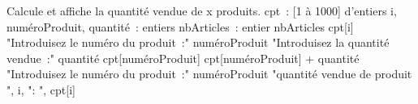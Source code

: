 	\begin{Pseudocode}
	\LComment Calcule et affiche la quantité vendue de x produits.
		\Empty
		\Decl cpt~:  [1 à 1000] d’entiers
		\Decl i, numéroProduit, quantité~: entiers
		\Decl nbArticles~: entier
		\Read nbArticles
		\Empty
			\Let cpt[i] 
		\EndFor
		\Empty
		\Write "Introduisez le numéro du produit~:"
		\Read numéroProduit
		\Empty
		\Empty
			\Write "Introduisez la quantité vendue~:"
			\Read quantité
			\Empty
			\Let cpt[numéroProduit] \Gets cpt[numéroProduit] + quantité
			\Empty
			\Write "Introduisez le numéro du produit~:"
			\Read numéroProduit
			\Empty
		\EndWhile
		\Empty
			\Write "quantité vendue de produit ", i, ": ", cpt[i]
		\EndFor
		\Empty
	\EndModule
	\end{Pseudocode}
	




	
